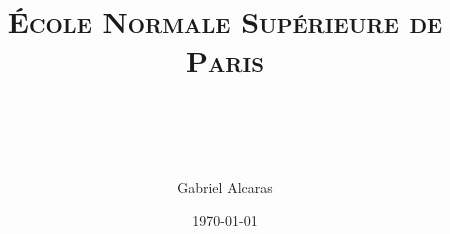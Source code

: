 \documentclass[paper=a4]{scrartcl} %
\title{\normalfont\normalsize 
  \textsc{École Normale Supérieure de Paris} \\[25pt] %
  \horrule{0.5pt} \\[0.4cm] %
  \large %
  \horrule{2pt} \\[0.5cm] %
}
\author{Gabriel Alcaras} %
\date{\normalsize \today} %
\numberwithin{equation}{section}
\numberwithin{figure}{section}
\numberwithin{table}{section}
\begin{document}
\frenchspacing
\maketitle %

\pagebreak
\printbibliography\
\end{document}

